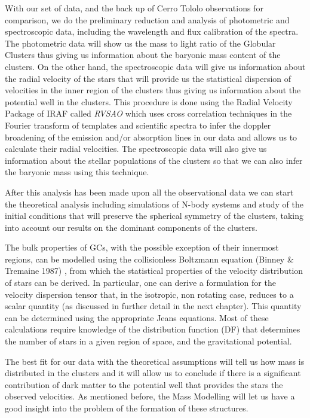 With our set of data, and the back up of Cerro Tololo observations for comparison, we do the preliminary reduction and analysis of photometric and spectroscopic data, including the wavelength and flux calibration of the spectra. The photometric data will show us the mass to light ratio of the Globular Clusters thus giving us information about the baryonic mass content of the clusters. On the other hand, the spectroscopic data will give us information about the radial velocity of the stars that will provide us the statistical dispersion of velocities in the inner region of the clusters thus giving us information about the potential well in the clusters.  This procedure is done using the Radial Velocity Package of IRAF called \textit{RVSAO} which uses cross correlation techniques in the Fourier transform of templates and scientific spectra to infer the doppler broadening of the emission and/or absorption lines in our data and allows us to calculate their radial velocities. The spectroscopic data will also give us information about the stellar populations of the clusters so that we can also infer the baryonic mass using this technique. 

After this analysis has been made upon all the observational data we can start the theoretical analysis including simulations of N-body systems and study of the initial conditions that will preserve the spherical symmetry of the clusters, taking into account our results on the dominant components of the clusters. 

The bulk properties of GCs, with the possible exception of their innermost regions, can be modelled using the collisionless Boltzmann equation (Binney \& Tremaine 1987) \cite{3}, from which the statistical properties of the velocity distribution of stars can be derived. In particular, one can derive a formulation for the velocity dispersion tensor that, in the isotropic, non rotating case, reduces to a scalar quantity (as discussed in further detail in the next chapter). This quantity can be determined using the appropriate Jeans equations. Most of these calculations require knowledge of the distribution function (DF) that determines the number of stars in a given region of space, and the gravitational potential.

The best fit for our data with the theoretical assumptions will tell us how mass is distributed in the clusters and it will allow us to conclude if there is a significant contribution of dark matter to the potential well that provides the stars the observed velocities. As mentioned before, the Mass Modelling will let us have a good insight into the problem of the formation of these structures.


